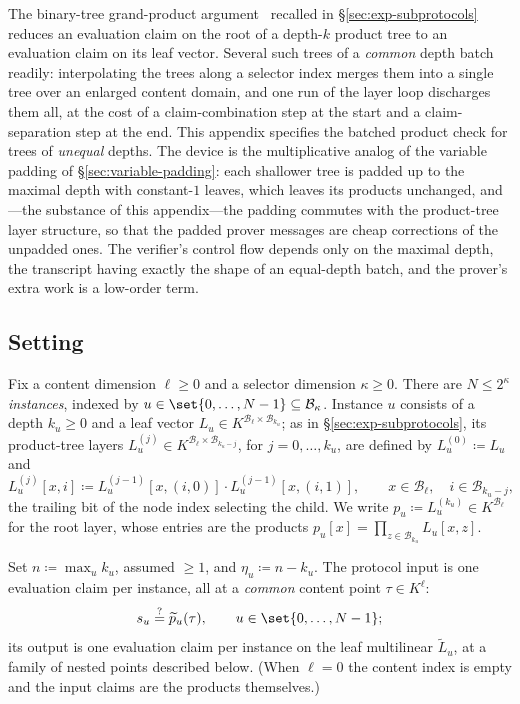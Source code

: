 \documentclass{article}
\theoremstyle{definition}
\newcommand*{\mle}{\widetilde}
\newcommand{\BB}{\mathcal{B}}
\begin{document}
The binary-tree grand-product argument~\cite{Thaler:2013aa} recalled in \S\ref{sec:exp-subprotocols} reduces an evaluation claim on the root of a depth-$k$ product tree to an evaluation claim on its leaf vector. Several such trees of a \emph{common} depth batch readily: interpolating the trees along a selector index merges them into a single tree over an enlarged content domain, and one run of the layer loop discharges them all, at the cost of a claim-combination step at the start and a claim-separation step at the end. This appendix specifies the batched product check for trees of \emph{unequal} depths. The device is the multiplicative analog of the variable padding of \S\ref{sec:variable-padding}: each shallower tree is padded up to the maximal depth with constant-$1$ leaves, which leaves its products unchanged, and---the substance of this appendix---the padding commutes with the product-tree layer structure, so that the padded prover messages are cheap corrections of the unpadded ones. The verifier's control flow depends only on the maximal depth, the transcript having exactly the shape of an equal-depth batch, and the prover's extra work is a low-order term.

\subsection{Setting}
\label{app:padded-prodcheck-setting}

Fix a content dimension $\ell \geq 0$ and a selector dimension $\kappa \geq 0$. There are $N \leq 2^\kappa$ \emph{instances}, indexed by $u \in \set{0, \ldots, N - 1} \subseteq \BB_\kappa$. Instance $u$ consists of a depth $k_u \geq 0$ and a leaf vector $L_u \in K^{\BB_\ell \times \BB_{k_u}}$; as in \S\ref{sec:exp-subprotocols}, its product-tree layers $L^{(j)}_u \in K^{\BB_\ell \times \BB_{k_u - j}}$, for $j = 0, \ldots, k_u$, are defined by $L^{(0)}_u \coloneqq L_u$ and
\[
  L^{(j)}_u[x, i] \coloneqq L^{(j - 1)}_u[x, (i, 0)] \cdot L^{(j - 1)}_u[x, (i, 1)], \qquad x \in \BB_\ell, \quad i \in \BB_{k_u - j},
\]
the trailing bit of the node index selecting the child. We write $p_u \coloneqq L^{(k_u)}_u \in K^{\BB_\ell}$ for the root layer, whose entries are the products $p_u[x] = \prod_{z \in \BB_{k_u}} L_u[x, z]$.

Set $n \coloneqq \max_u k_u$, assumed $\geq 1$, and $\eta_u \coloneqq n - k_u$. The protocol input is one evaluation claim per instance, all at a \emph{common} content point $\tau \in K^\ell$:
\[
  s_u \stackrel{?}{=} \mle{p}_u(\tau), \qquad u \in \set{0, \ldots, N - 1};
\]
its output is one evaluation claim per instance on the leaf multilinear $\mle{L}_u$, at a family of nested points described below. (When $\ell = 0$ the content index is empty and the input claims are the products themselves.)
\end{document}
